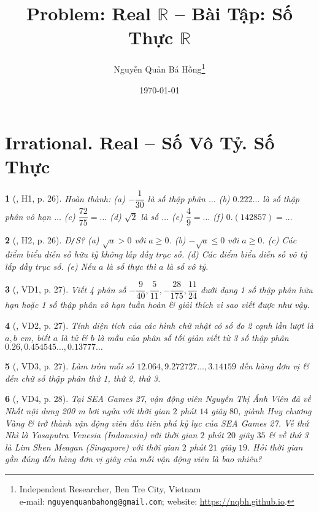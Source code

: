 \documentclass{article}
\title{Problem: Real $\mathbb{R}$ -- Bài Tập: Số Thực $\mathbb{R}$}
\author{Nguyễn Quản Bá Hồng\footnote{Independent Researcher, Ben Tre City, Vietnam\\e-mail: \texttt{nguyenquanbahong@gmail.com}; website: \url{https://nqbh.github.io}.}}
\date{\today}
\newtheorem{baitoan}{}
\begin{document}
\maketitle
\tableofcontents


\section{Irrational. Real -- Số Vô Tỷ. Số Thực}

\begin{baitoan}[\cite{Binh_boi_duong_Toan_7_tap_1}, H1, p. 26]
	Hoàn thành: (a) $-\dfrac{1}{30}$ là số thập phân $\ldots$ (b) $0.222\ldots$ là số thập phân vô hạn $\ldots$ (c) $\dfrac{72}{75} = \ldots$ (d) $\sqrt{2}$ là số $\ldots$ (e) $\dfrac{4}{9} = \ldots$ (f) $0.(142857) = \ldots$
\end{baitoan}

\begin{baitoan}[\cite{Binh_boi_duong_Toan_7_tap_1}, H2, p. 26]
	{\rm Đ{\tt/}S?} (a) $\sqrt{a} > 0$ với $a\ge0$. (b) $-\sqrt{a}\le0$ với $a\ge0$. (c) Các điểm biểu diễn số hữu tỷ không lấp đầy trục số. (d) Các điểm biểu diễn số vô tỷ lấp đầy trục số. (e) Nếu $a$ là số thực thì $a$ là số vô tỷ.
\end{baitoan}

\begin{baitoan}[\cite{Binh_boi_duong_Toan_7_tap_1}, VD1, p. 27]
	Viết 4 phân số $-\dfrac{9}{40},\dfrac{5}{11},-\dfrac{28}{175},\dfrac{11}{24}$ dưới dạng 1 số thập phân hữu hạn hoặc 1 số thập phân vô hạn tuần hoàn \& giải thích vì sao viết được như vậy.
\end{baitoan}

\begin{baitoan}[\cite{Binh_boi_duong_Toan_7_tap_1}, VD2, p. 27]
	Tính diện tích của các hình chữ nhật có số đo 2 cạnh lần lượt là $a,b$ {\rm cm}, biết $a$ là tử \& $b$ là mẫu của {\rm phân số tối giản} viết từ 3 số thập phân $0.26,0.454545\ldots,0.13777\ldots$
\end{baitoan}

\begin{baitoan}[\cite{Binh_boi_duong_Toan_7_tap_1}, VD3, p. 27]
	Làm tròn mỗi số $12.064,9.272727\ldots,3.14159$ đến hàng đơn vị \& đến chữ số thập phân thứ 1, thứ 2, thứ 3.
\end{baitoan}

\begin{baitoan}[\cite{Binh_boi_duong_Toan_7_tap_1}, VD4, p. 28]
	Tại SEA Games 27, vận động viên Nguyễn Thị Ánh Viên đã về Nhất nội dung {\rm200 m} bơi ngửa với thời gian $2$ phút $14$ giây $80$, giành Huy chương Vàng \& trở thành vận động viên đầu tiên phá kỷ lục của SEA Games 27. Về thứ Nhì là Yosaputra Venesia (Indonesia) với thời gian $2$ phút $20$ giây $35$ \& về thứ 3 là Lim Shen Meagan (Singapore) với thời gian $2$ phút $21$ giây $19$. Hỏi thời gian gần đúng đến hàng đơn vị giây của mỗi vận động viên là bao nhiêu?
\end{baitoan}
\end{document}
